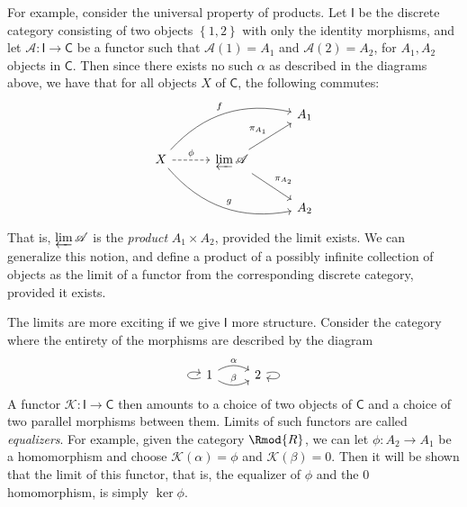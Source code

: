 For example, consider the universal property of products. Let $\mathsf{I} $ be the discrete category consisting of two objects $\left\{ 1,2 \right\} $ with only the identity morphisms, and let $\mathscr{A} : \mathsf{I}  \to \mathsf{C} $ be a functor such that $\mathscr{A} (1)=A_1$ and $\mathscr{A} (2)=A_2$, for $A_1,A_2$ objects in $\mathsf{C} $. Then since there exists no such $\alpha $ as described in the diagrams above, we have that for all objects $X$ of $\mathsf{C} $, the following commutes:
\[\begin{tikzcd}[row sep = 2em, column sep = 3em]
	&&A_1\\
	X\arrow[urr, bend left, "f"]\arrow[drr, bend right, "g"]\arrow[r, dashed, "\phi "]&\varprojlim \mathscr{A} \arrow[ur, "\pi_{A_1} "]\arrow[dr, "\pi_{A_2} "]\\
								&&A_2
\end{tikzcd}\]
That is, $\varprojlim \mathscr{A} $ is the \emph{product} $A_1\times A_2$, provided the limit exists. We can generalize this notion, and define a product of a possibly infinite collection of objects as the limit of a functor from the corresponding discrete category, provided it exists.

The limits are more exciting if we give $\mathsf{I} $ more structure. Consider the category where the entirety of the morphisms are described by the diagram
\[\begin{tikzcd}[row sep = 2.5em, column sep = 2.5em]
	1\arrow[loop left]\arrow[r, bend left, "\alpha "]\arrow[r, bend right, "\beta "]&2\arrow[loop right]
\end{tikzcd}\]
A functor $\mathscr{K} : \mathsf{I}  \to \mathsf{C} $ then amounts to a choice of two objects of $\mathsf{C} $ and a choice of two parallel morphisms between them. Limits of such functors are called \emph{equalizers}. For example, given the category $\Rmod{R} $, we can let $\phi : A_2 \to A_1$ be a homomorphism and choose $\mathscr{K} (\alpha )=\phi $ and $\mathscr{K} (\beta )=0$. Then it will be shown that the limit of this functor, that is, the equalizer of $\phi $ and the 0 homomorphism, is simply $\ker \phi $.

